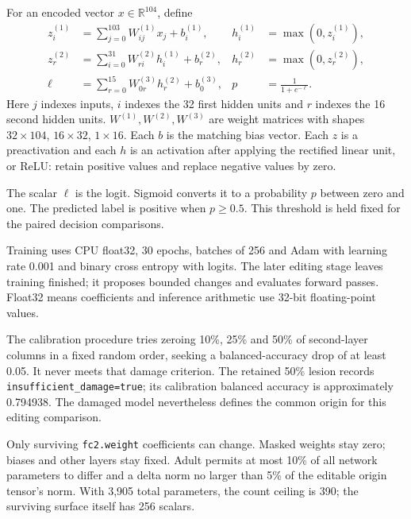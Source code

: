 For an encoded vector $x\in\mathbb R^{104}$, define
\begin{align*}
z^{(1)}_i&=\sum_{j=0}^{103}W^{(1)}_{ij}x_j+b^{(1)}_i,
&h^{(1)}_i&=\max(0,z^{(1)}_i),\\
z^{(2)}_r&=\sum_{i=0}^{31}W^{(2)}_{ri}h^{(1)}_i+b^{(2)}_r,
&h^{(2)}_r&=\max(0,z^{(2)}_r),\\
\ell&=\sum_{r=0}^{15}W^{(3)}_{0r}h^{(2)}_r+b^{(3)}_0,
&p&=\frac{1}{1+e^{-\ell}}.
\end{align*}
Here $j$ indexes inputs, $i$ indexes the 32 first hidden units and $r$ indexes the 16 second hidden units. $W^{(1)},W^{(2)},W^{(3)}$ are weight matrices with shapes $32\times104$, $16\times32$, $1\times16$. Each $b$ is the matching bias vector. Each $z$ is a preactivation and each $h$ is an activation after applying the rectified linear unit, or ReLU: retain positive values and replace negative values by zero.

The scalar $\ell$ is the logit. Sigmoid converts it to a probability $p$ between zero and one. The predicted label is positive when $p\ge0.5$. This threshold is held fixed for the paired decision comparisons.

Training uses CPU float32, 30 epochs, batches of 256 and Adam with learning rate 0.001 and binary cross entropy with logits. The later editing stage leaves training finished; it proposes bounded changes and evaluates forward passes. Float32 means coefficients and inference arithmetic use 32-bit floating-point values.


The calibration procedure tries zeroing 10\%, 25\% and 50\% of second-layer columns in a fixed random order, seeking a balanced-accuracy drop of at least 0.05. It never meets that damage criterion. The retained 50\% lesion records \texttt{insufficient\_damage=true}; its calibration balanced accuracy is approximately 0.794938. The damaged model nevertheless defines the common origin for this editing comparison.

Only surviving \texttt{fc2.weight} coefficients can change. Masked weights stay zero; biases and other layers stay fixed. Adult permits at most 10\% of all network parameters to differ and a delta norm no larger than 5\% of the editable origin tensor's norm. With 3,905 total parameters, the count ceiling is 390; the surviving surface itself has 256 scalars.

